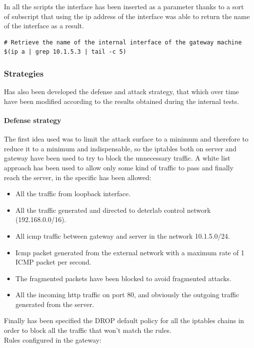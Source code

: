 \documentclass[14pt]{article}
\begin{document}
In all the scripts the interface has been inserted as a parameter thanks to a sort of subscript that using the ip address of the interface was able to return the name of the interface as a result.
\begin{Verbatim}
# Retrieve the name of the internal interface of the gateway machine
$(ip a | grep 10.1.5.3 | tail -c 5)
\end{Verbatim}

\subsubsection{Strategies}
Has also been developed the defense and attack strategy, that which over time have been modified according to the results obtained during the internal tests.

\paragraph{Defense strategy}
The first idea used was to limit the attack surface to a minimum and therefore to reduce it to a minimum and indispensable, so the iptables both on server and gateway have been used to try to block the unnecessary traffic. A white list approach has been used to allow only some kind of traffic to pass and finally reach the server, in the specific has been allowed:
\begin{itemize}
	\item All the traffic from loopback interface.
	\item All the traffic generated and directed to deterlab control network (192.168.0.0/16).
	\item All icmp traffic between gateway and server in the network 10.1.5.0/24.
	\item Icmp packet generated from the external network with a maximum rate of 1 ICMP packet per second.
	\item The fragmented packets have been blocked to avoid fragmented attacks.
	\item All the incoming http traffic on port 80, and obviously the outgoing traffic generated from the server.
\end{itemize}
Finally has been specified the DROP default policy for all the iptables chains in order to block all the traffic that won't match the rules. 
\\
Rules configured in the gateway:
\end{document}
